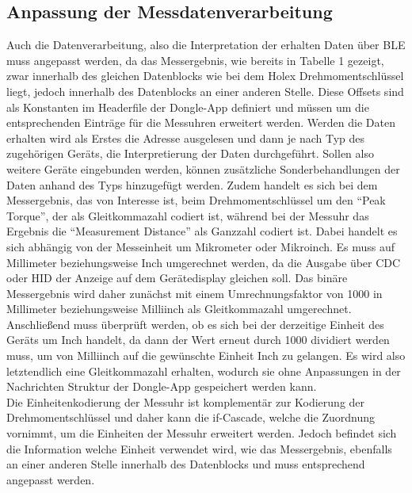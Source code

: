 \subsection{Anpassung der Messdatenverarbeitung}
Auch die Datenverarbeitung, also die Interpretation der erhalten Daten über \ac{BLE} muss angepasst werden, da das Messergebnis, wie bereits in Tabelle 1 gezeigt, zwar innerhalb des gleichen Datenblocks wie bei dem Holex Drehmomentschlüssel liegt, jedoch innerhalb des Datenblocks an einer anderen Stelle. Diese Offsets sind als Konstanten im Headerfile der Dongle-App definiert und müssen um die entsprechenden Einträge für die Messuhren erweitert werden. Werden die Daten erhalten wird als Erstes die Adresse ausgelesen und dann je nach Typ des zugehörigen Geräts, die Interpretierung der Daten durchgeführt. Sollen also weitere Geräte eingebunden werden, können zusätzliche Sonderbehandlungen der Daten anhand des Typs hinzugefügt werden. Zudem handelt es sich bei dem Messergebnis, das von Interesse ist, beim Drehmomentschlüssel um den ``Peak Torque'', der als Gleitkommazahl codiert ist, während bei der Messuhr das Ergebnis die ``Measurement Distance'' als Ganzzahl codiert ist. Dabei handelt es sich abhängig von der Messeinheit um Mikrometer oder Mikroinch. Es muss auf Millimeter beziehungsweise Inch umgerechnet werden, da die Ausgabe über CDC oder \ac{HID} der Anzeige auf dem Gerätedisplay gleichen soll. Das binäre Messergebnis wird daher zunächst mit einem Umrechnungsfaktor von 1000 in Millimeter beziehungsweise Milliinch als Gleitkommazahl umgerechnet. Anschließend muss überprüft werden, ob es sich bei der derzeitige Einheit des Geräts um Inch handelt, da dann der Wert erneut durch 1000 dividiert werden muss, um von Milliinch auf die gewünschte Einheit Inch zu gelangen. Es wird also letztendlich eine Gleitkommazahl erhalten, wodurch sie ohne Anpassungen in der Nachrichten Struktur der Dongle-App gespeichert werden kann.\\
Die Einheitenkodierung der Messuhr ist komplementär zur Kodierung der Drehmomentschlüssel und daher kann die if-Cascade, welche die Zuordnung vornimmt, um die Einheiten der Messuhr erweitert werden. Jedoch befindet sich die Information welche Einheit verwendet wird, wie das Messergebnis, ebenfalls an einer anderen Stelle innerhalb des Datenblocks und muss entsprechend angepasst werden.

